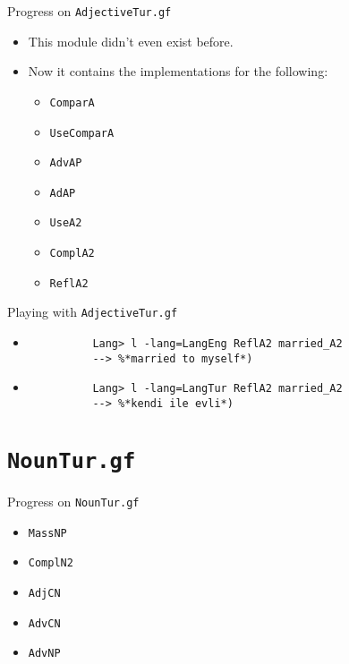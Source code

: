 \documentclass{beamer}
\begin{document}
  \begin{frame}{Progress on \texttt{AdjectiveTur.gf}}
    \begin{itemize}
      \item<1-> This module didn't even exist before.
      \item<2-> Now it contains the implementations for the following:
        \begin{itemize}
          \item \texttt{ComparA}
          \item \texttt{UseComparA}
          \item \texttt{AdvAP}
          \item \texttt{AdAP}
          \item \texttt{UseA2}
          \item \texttt{ComplA2}
          \item \texttt{ReflA2}
        \end{itemize}
    \end{itemize}
  \end{frame}

  \begin{frame}[fragile]{Playing with \texttt{AdjectiveTur.gf}}
    \begin{itemize}
      \item<1->
        \begin{lstlisting}
          Lang> l -lang=LangEng ReflA2 married_A2
          --> %*married to myself*)
        \end{lstlisting}
      \item<2->
        \begin{lstlisting}
          Lang> l -lang=LangTur ReflA2 married_A2
          --> %*kendi ile evli*)
        \end{lstlisting}
    \end{itemize}
  \end{frame}

  \section{\texttt{NounTur.gf}}

  \begin{frame}{Progress on \texttt{NounTur.gf}}
    \begin{itemize}
      \item \texttt{MassNP}
      \item \texttt{ComplN2}
      \item \texttt{AdjCN}
      \item \texttt{AdvCN}
      \item \texttt{AdvNP}
    \end{itemize}
  \end{frame}
\end{document}
